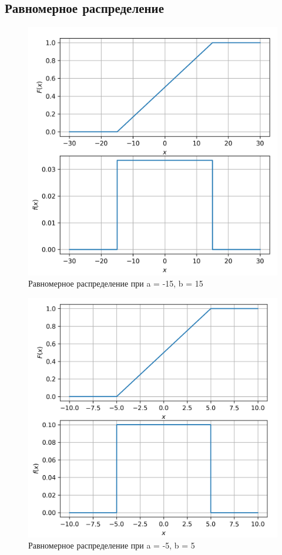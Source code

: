 \documentclass[a4paper, 12pt]{article}
\begin{document}
\subsection{Равномерное распределение}
\begin{figure}[h!]
	\centering \includegraphics[scale=0.8]{ud1}
	\centering\caption{Равномерное распределение при a = -15, b = 15}
\end{figure}
\clearpage
\newpage
\begin{figure}[t!]
	\centering \includegraphics[scale=0.8]{ud2}
	\centering\caption{Равномерное распределение при a = -5, b = 5}
\end{figure}
\clearpage
\newpage
\end{document}
